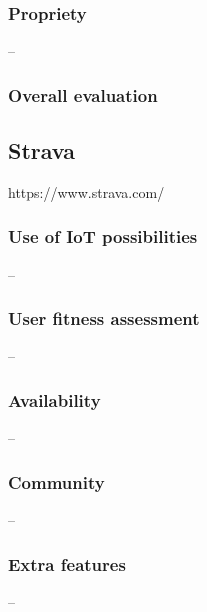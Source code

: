 \subsubsection*{Propriety} -- 
\subsubsection*{Overall evaluation}

\subsection{Strava}
https://www.strava.com/
\subsubsection*{Use of IoT possibilities} --
\subsubsection*{User fitness assessment} --
\subsubsection*{Availability} --
\subsubsection*{Community} -- 
\subsubsection*{Extra features} -- 
